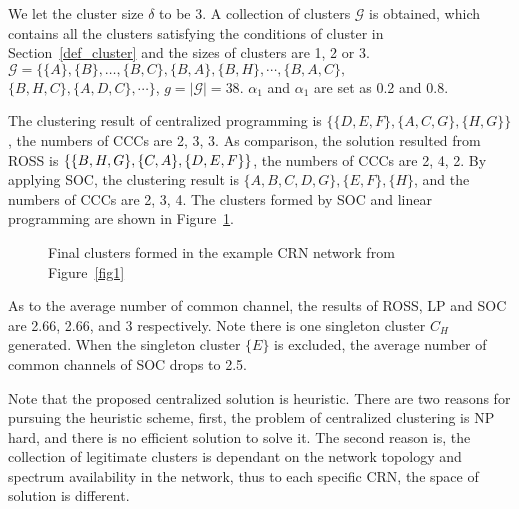 \documentclass[journal,comsoc]{IEEEtran}
\theoremstyle{mytheoremstyle}
\theoremstyle{mytheoremstyle}
\theoremstyle{mytheoremstyle}
\begin{document}
We let the cluster size $\delta$ to be 3.
A collection of clusters $\mathcal{G}$ is obtained, which contains all the clusters satisfying the conditions of cluster in Section~\ref{def_cluster} and the sizes of clusters are 1, 2 or 3. 
$\mathcal{G}=\{\{A\}, \{B\},\dots,\{B,C\},\{B,A\},\{B,H\},\cdots,\{B,A,C\},$\\$\{B,H,C\}, \{A,D,C\},\cdots\}$, $g = |\mathcal{G}|=38$.
$\alpha_1$ and $\alpha_1$ are set as 0.2 and 0.8. 

The clustering result of centralized programming is $\{\{D,E,F\},\{A,C,G\},\{H,G\}\}$, the numbers of CCCs are 2, 3, 3.
As comparison, the solution resulted from ROSS is $\newline \{\{B,H,G\},\{C,A\},\{D,E,F\}\}$, the numbers of CCCs are 2, 4, 2.
By applying SOC, the clustering result is $\{A,B,C,D,G\},\{E,F\},\{H\}$, and the numbers of CCCs are 2, 3, 4.
The clusters formed by SOC and linear programming are shown in Figure~\ref{fig:final_clustering}.

\begin{figure}[ht]
\begin{center}
{}
\end{center}
\caption{Final clusters formed in the example CRN network from Figure~\ref{fig1}}
\label{fig:final_clustering}
\end{figure}

 
As to the average number of common channel, the results of ROSS, LP and SOC are 2.66, 2.66, and 3 respectively. 
Note there is one singleton cluster $C_H$ generated.
When the singleton cluster $\{E\}$ is excluded, the average number of common channels of SOC drops to 2.5. 


Note that the proposed centralized solution is heuristic.
There are two reasons for pursuing the heuristic scheme, first, the problem of centralized clustering is NP hard, and there is no efficient solution to solve it.
The second reason is, the collection of legitimate clusters is dependant on the network topology and spectrum availability in the network, thus to each specific CRN, the space of solution is different.
\end{document}
